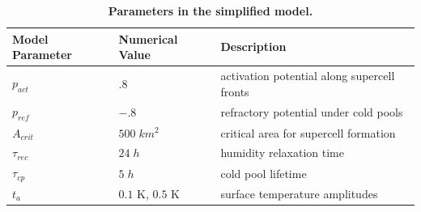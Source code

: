\documentclass[draft,linenumbers]{agujournal2019}
\begin{document}
\begin{table}[b]
\begin{tabular}{lll}
    Model Parameter & Numerical Value & Description \\
    \hline
    $p_{act}$ & $.8$ & activation potential along supercell fronts \\ 
    $p_{ref}$ & $-.8$ & refractory potential under cold pools\\
    $A_{crit}$ & $500\;km^2$ & critical area for supercell formation \\
    $\tau_{rec}$ & $24\;h$ & humidity relaxation time \\ 
    $\tau_{cp}$ & $5\;h$ & cold pool lifetime \\ 
    $t_a$ & $0.1$ K, $0.5$ K & surface temperature amplitudes \\
    \hline
\end{tabular}
\caption{{\bf Parameters in the simplified model.}}
\label{tab:parameters}
\end{table}
\end{document}
